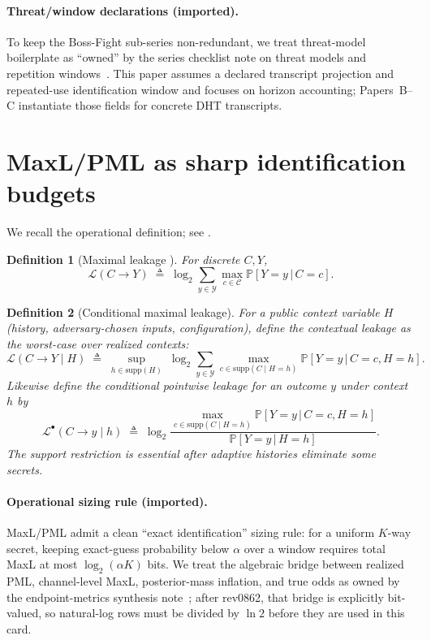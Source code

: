 \documentclass[11pt]{article}
\newcommand{\Prb}{\mathbb{P}}
\newcommand{\supp}{\mathrm{supp}}
\newcommand{\MaxL}{\mathcal{L}}
\newcommand{\PML}{\mathcal{L}^{\bullet}}
\newcommand{\given}{\,|\,}
\newcommand{\logtwo}{\log_2}
\newcommand{\C}{\mathcal{C}} %
\newcommand{\Y}{\mathcal{Y}} %
\newtheorem{definition}{Definition}
\begin{document}
\paragraph{Threat/window declarations (imported).}
To keep the Boss-Fight sub-series non-redundant, we treat threat-model boilerplate as ``owned'' by the series checklist note on threat models and repetition windows~\cite{series:threatwindows}.
This paper assumes a declared transcript projection and repeated-use identification window and focuses on horizon accounting; Papers~B--C instantiate those fields for concrete DHT transcripts.

\section{MaxL/PML as sharp identification budgets}\label{sec:maxl}
We recall the operational definition; see \cite{issa2020operational}.

\begin{definition}[Maximal leakage \cite{issa2020operational}]
For discrete $C,Y$,
\[
\MaxL(C\!\to\!Y)\;\triangleq\;\logtwo\sum_{y\in\Y}\max_{c\in\C}\Prb[Y=y\given C=c].
\]
\end{definition}


\begin{definition}[Conditional maximal leakage]\label{def:condmaxl}
For a public context variable $H$ (history, adversary-chosen inputs, configuration), define the \emph{contextual} leakage as the worst-case over realized contexts:
\[
\MaxL(C\!\to\!Y\mid H)\;\triangleq\;\sup_{h\in\supp(H)}\;\logtwo\sum_{y\in\Y}\max_{c\in\supp(C\mid H=h)}\Prb[Y=y\given C=c,H=h].
\]
Likewise define the conditional pointwise leakage for an outcome $y$ under context $h$ by
\[
\PML(C\!\to\!y\mid h)\;\triangleq\;\logtwo\frac{\max_{c\in\supp(C\mid H=h)}\Prb[Y=y\given C=c,H=h]}{\Prb[Y=y\given H=h]}.
\]
The support restriction is essential after adaptive histories eliminate some secrets.
\end{definition}
\paragraph{Operational sizing rule (imported).}
MaxL/PML admit a clean ``exact identification'' sizing rule: for a uniform $K$-way secret, keeping exact-guess probability below $\alpha$ over a window requires total MaxL at most $\log_2(\alpha K)$ bits.
We treat the algebraic bridge between realized PML, channel-level MaxL, posterior-mass inflation, and true odds as owned by the endpoint-metrics synthesis note~\cite{series:endpointbridge}; after rev0862, that bridge is explicitly bit-valued, so natural-log rows must be divided by $\ln 2$ before they are used in this card.
\end{document}
